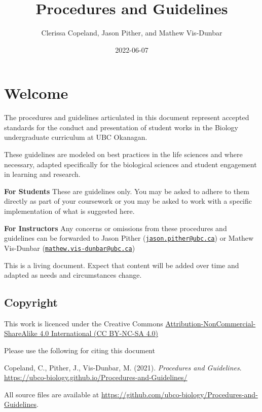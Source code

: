 \documentclass[
]{book}
\title{Procedures and Guidelines}
\author{Clerissa Copeland, Jason Pither, and Mathew Vis-Dunbar}
\date{2022-06-07}
\begin{document}
\maketitle

{
\setcounter{tocdepth}{1}
\tableofcontents
}
\hypertarget{welcome}{%
\chapter*{Welcome}\label{welcome}}

The procedures and guidelines articulated in this document represent accepted standards for the conduct and presentation of student works in the Biology undergraduate curriculum at UBC Okanagan.

These guidelines are modeled on best practices in the life sciences and where necessary, adapted specifically for the biological sciences and student engagement in learning and research.

\textbf{For Students} These are guidelines only. You may be asked to adhere to them directly as part of your coursework or you may be asked to work with a specific implementation of what is suggested here.

\textbf{For Instructors} Any concerns or omissions from these procedures and guidelines can be forwarded to Jason Pither (\href{mailto:jason.pither@ubc.ca}{\nolinkurl{jason.pither@ubc.ca}}) or Mathew Vis-Dunbar (\href{mailto:mathew.vis-dunbar@ubc.ca}{\nolinkurl{mathew.vis-dunbar@ubc.ca}})

This is a living document. Expect that content will be added over time and adapted as needs and circumstances change.

\hypertarget{copyright}{%
\section*{Copyright}\label{copyright}}

This work is licenced under the Creative Commons \href{https://creativecommons.org/licenses/by-nc-sa/4.0/}{Attribution-NonCommercial-ShareAlike 4.0 International (CC BY-NC-SA 4.0)}

Please use the following for citing this document

Copeland, C., Pither, J., Vis-Dunbar, M. (2021). \emph{Procedures and Guidelines}. \url{https://ubco-biology.github.io/Procedures-and-Guidelines/}

All source files are available at \url{https://github.com/ubco-biology/Procedures-and-Guidelines}.
\end{document}
